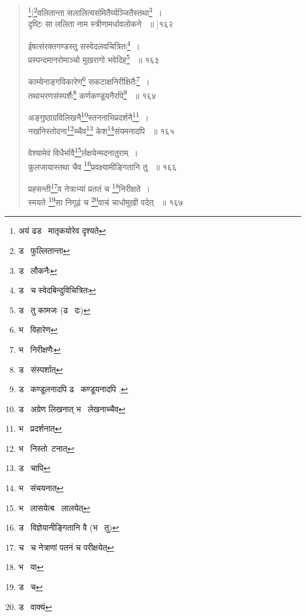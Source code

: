 \documentclass[11pt, openany]{book}
\begin{document}
{\begin{quote}
{\renewcommand{\thefootnote}{4}\footnote{अयं ढड \textendash\ मातृकयोरेव दृश्यते}[\renewcommand{\thefootnote}{5}\footnote{ड \textendash\ फुल्लितान्ता}वलितान्ता सलालित्यसंमितैर्व्यञ्जितैस्तथा\renewcommand{\thefootnote}{6}\footnote{ड \textendash\ लौकनैः}~।\\ 
दृष्टिः सा ललिता नाम स्त्रीणामर्धावलोकने ~॥ ]१६२ 

ईषत्संरक्तगण्डस्तु सस्वेदलवचित्रितः\renewcommand{\thefootnote}{7}\footnote{ड \textendash\ च स्वेदबिन्दुविचित्रितः }~।\\ 
प्रस्पन्दमानरोमाञ्चो मुखरागो भवेदिह\renewcommand{\thefootnote}{8}\footnote{ड \textendash\ तु कामजः (ढ \textendash\ दः)} ~॥ १६३ 

काम्येनाङ्गविकारेण\renewcommand{\thefootnote}{9}\footnote{भ \textendash\ विहारेण } सकटाक्षनिरीक्षितैः\renewcommand{\thefootnote}{10}\footnote{भ \textendash\ निरीक्षणैः}~। \\
तथाभरणसंस्पर्शैः\renewcommand{\thefootnote}{11}\footnote{ड \textendash\ संस्पर्शात्} कर्णकण्डूयनैरपि\renewcommand{\thefootnote}{12}\footnote{ड \textendash\ कण्डूलनादपि ढ \textendash\ कण्डूयनादपि .} ~॥ १६४ 

अङ्गुष्ठाग्रविलिखनै\renewcommand{\thefootnote}{13}\footnote{ड \textendash\ अग्रेण लिखनात् भ \textendash\ लेखनाच्चैव}स्तननाभिप्रदर्शनै\renewcommand{\thefootnote}{14}\footnote{भ \textendash\ प्रदर्शनात् }~।\\
नखनिस्तोदना\renewcommand{\thefootnote}{15}\footnote{भ \textendash\ निस्तो\textendash\ टनात् }च्चैव\renewcommand{\thefootnote}{16}\footnote{ड \textendash\ चापि } केश\renewcommand{\thefootnote}{17}\footnote{भ \textendash\ संचयनात्}संयमनादपि ~॥ १६५ 

वेश्यामेवं विधैर्भावै\renewcommand{\thefootnote}{18}\footnote{भ \textendash\ लासयेत्ब \textendash\ लालयेत्}र्लक्षयेन्मदनातुराम्~।\\ 
कुलजायास्तथा चैव \renewcommand{\thefootnote}{19}\footnote{ड \textendash\ विज्ञेयानीङ्गितानि वै (भ \textendash\ तु)}प्रवक्ष्यामीङ्गितानि तु ~॥ १६६ 

प्रहसन्ती\renewcommand{\thefootnote}{20}\footnote{च \textendash\ च नेत्राणां पतनं च परीक्षयेत्}व नेत्राभ्यां प्रततं च \renewcommand{\thefootnote}{21}\footnote{भ \textendash\ या}निरीक्षते~। \\
स्मयते \renewcommand{\thefootnote}{22}\footnote{ड \textendash\ च}सा निगूढं च \renewcommand{\thefootnote}{23}\footnote{ड \textendash\ वाक्यं}वाचं चाधोमुखी वदेत् ~॥ १६७}
\end{quote}

\newpage

}
\end{document}
